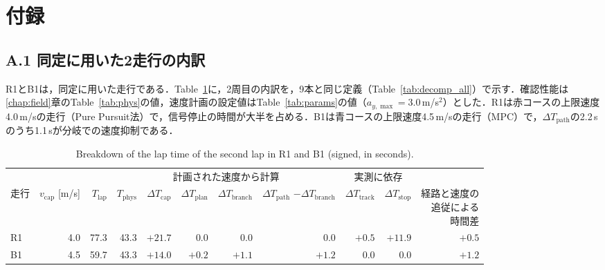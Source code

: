 \chapter*{付録}
\setcounter{table}{0}
\renewcommand{\thetable}{A.\arabic{table}}
\setcounter{figure}{0}
\renewcommand{\thefigure}{A.\arabic{figure}}

\section*{A.1 同定に用いた2走行の内訳}
\label{sec:app_r1b1}
R1とB1は，同定に用いた走行である．Table~\ref{tab:decomp}に，2周目の内訳を，9本と同じ定義（Table~\ref{tab:decomp_all}）で示す．確認性能は\ref{chap:field}章のTable~\ref{tab:phys}の値，速度計画の設定値はTable~\ref{tab:params}の値（$a_{y,\max}=3.0$\,m/s$^2$）とした．R1は赤コースの上限速度4.0\,m/sの走行（Pure Pursuit法）で，信号停止の時間が大半を占める．B1は青コースの上限速度4.5\,m/sの走行（MPC）で，$\Delta T_{\mathrm{path}}$の2.2\,sのうち1.1\,sが分岐での速度抑制である．

\begin{table}[!htbp]
  \centering
  \caption{Breakdown of the lap time of the second lap in R1 and B1 (signed, in seconds).}
  \label{tab:decomp}
  \footnotesize
  \begin{lrbox}{\tblbox}\setlength{\tabcolsep}{3pt}\begin{tabular}{lrrrrrrrrrr}
    \toprule
    & & & \multicolumn{5}{c}{計画された速度から計算} & \multicolumn{2}{c}{実測に依存} & \\
    \cmidrule(lr){4-8}\cmidrule(lr){9-10}
    走行 & \shortstack[r]{$v_{\mathrm{cap}}$\\{[m/s]}} & $T_{\mathrm{lap}}$ & $T_{\mathrm{phys}}$ & $\Delta T_{\mathrm{cap}}$ & $\Delta T_{\mathrm{plan}}$ & $\Delta T_{\mathrm{branch}}$ & \shortstack[r]{$\Delta T_{\mathrm{path}}$\\$-\Delta T_{\mathrm{branch}}$} & $\Delta T_{\mathrm{track}}$ & $\Delta T_{\mathrm{stop}}$ & \shortstack[r]{経路と速度の\\追従による\\時間差} \\
    \midrule
    R1 & 4.0 & 77.3 & 43.3 & $+21.7$ & 0.0 & 0.0 & 0.0 & $+0.5$ & $+11.9$ & $+0.5$ \\
    B1 & 4.5 & 59.7 & 43.3 & $+14.0$ & $+0.2$ & $+1.1$ & $+1.2$ & 0.0 & 0.0 & $+1.2$ \\
    \bottomrule
  \end{tabular}\end{lrbox}\usebox{\tblbox}
\end{table}

